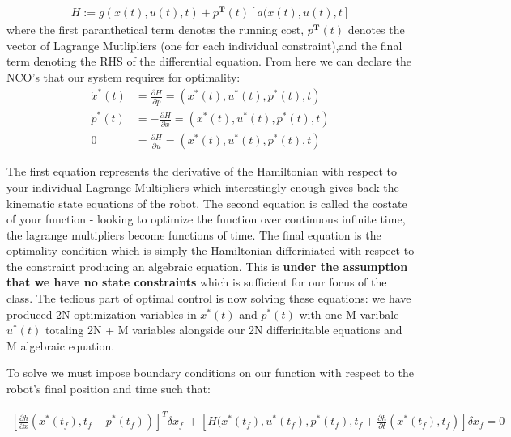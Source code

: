 \documentclass[twoside]{article}
\begin{document}
\begin{equation} \label{hamiltonian}
\begin{split}
H := g(x(t), u(t), t) + p^\textbf{T}(t)[a(x(t), u(t), t]
\end{split}
\end{equation}
where the first paranthetical term denotes the running cost, $p^\textbf{T}(t)$ denotes the vector of Lagrange Mutlipliers (one for each individual constraint),and the final term denoting the RHS of the differential equation.
From here we can declare the NCO's that our system requires for optimality:
\begin{equation} \label{hamiltonianNCOs}
\begin{split}
\dot{x}^*(t) &= \frac{\partial{H}}{\partial{p}} = (x^*(t), u^*(t), p^*(t), t)\\
\dot{p}^*(t) &= -\frac{\partial{H}}{\partial{x}} = (x^*(t), u^*(t), p^*(t), t)\\
0 &= \frac{\partial{H}}{\partial{u}} = (x^*(t), u^*(t), p^*(t), t)
\end{split}
\end{equation}

The first equation represents the derivative of the Hamiltonian with respect to your individual Lagrange Multipliers which interestingly enough gives back the kinematic state equations of the robot. The second equation is called the costate of your function - looking to optimize the function over continuous infinite time, the lagrange multipliers become functions of time. The final equation is the optimality condition which is simply the Hamiltonian differiniated with respect to the constraint producing an algebraic equation. This is \textbf{under the assumption that we have no state constraints} which is sufficient for our focus of the class. The tedious part of optimal control is now solving these equations: we have produced 2N optimization variables in $x^*(t)$ and $p^*(t)$ with one M varibale $u^*(t)$ totaling 2N + M variables alongside our 2N differinitable equations and M algebraic equation.

To solve we must impose boundary conditions on our function with respect to the robot's final position and time such that:

\begin{equation} \label{hamiltonianBCs}
\begin{split}
[\frac{\partial{h}}{\partial{x}}(x^*(t_f), t_f - p^*(t_f))]^T\delta{x_f}\ + [H(x^*(t_f), u^*(t_f), p^*(t_f), t_f + \frac{\partial{h}}{\partial{t}}(x^*(t_f), t_f)]\delta{x_f} = 0\\
\end{split}
\end{equation}
\end{document}
